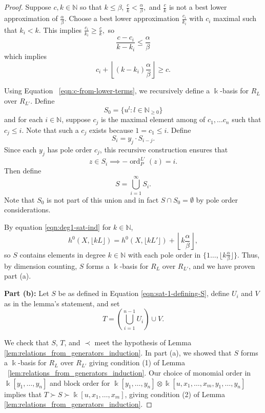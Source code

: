 \documentclass{amsart}
\theoremstyle{plain}
\theoremstyle{definition}
\theoremstyle{remark}
\numberwithin{equation}{section}
\newcommand\BN{{\mathbb N}}
\newcommand\Bk{{\Bbbk}}
\DeclareMathOperator{\ord}{ord}
\newcommand{\halfcan}{L}
\begin{document}
\begin{proof}
Suppose $c,k \in \BN$ so that $k \le \beta$,  $\frac{c}{k} < \frac{\alpha}{
\beta},$ and $\frac{c}{k}$ is not a best lower approximation of $\frac{\alpha}{\beta}$. Choose a
best lower approximation $\frac{c_i}{k_i}$ with $c_i$ maximal such that $k_i< k$.  This implies $\frac{c_i}{k_i}\ge \frac{c}{k},$ so 
\[
	\frac{c-c_i}{k-k_i}\le \frac{\alpha}{\beta}
\]
which implies
\begin{equation}\label{eqn:c-from-lower-terms}
	c_i +\left\lfloor (k-k_i) \frac{\alpha}{\beta} \right\rfloor \ge c.
\end{equation}

Using Equation ~\ref{eqn:c-from-lower-terms}, we recursively define a $\Bk$-basis for $R_\halfcan$ over $R_{\halfcan'}$. Define 
\[
	S_0 = \{u^l : l \in \BN_{\ge 0}\}
\]
and for each $i \in \BN$, suppose $c_j$ is the maximal element among of $c_1, \ldots c_n$ such that $c_j \le i.$ Note that such a $c_j$ exists because $1=c_1\le i.$ Define
\[
	S_i = y_j \cdot S_{i-j}.
\]
Since each $y_j$ has pole order $c_j$, this recursive construction ensures that 
\[
	z\in S_i \implies -\ord_P^{\halfcan'}(z)=i.
\]
Then define 
\begin{equation}\label{eqn:sat-1-defining-S}
	S = \bigcup_{i=1}^{\infty} S_i.  
\end{equation}
Note that $S_0$ is not part of this union and in fact $S\cap S_0 = \emptyset$ by pole order considerations.

By equation \ref{eqn:deg1-sat-ind} for $k \in \BN$,
\[
	h^0(X, \lfloor k \halfcan \rfloor) = h^0(X, \lfloor k \halfcan'
		\rfloor) + \left\lfloor k \frac{\alpha} {\beta} \right \rfloor,
\] 
so $S$ contains elements in degree $k \in \BN$ with each pole order in $\{1 \ldots, \lfloor k\frac{\alpha}{\beta}\rfloor\}$.  Thus, by dimension counting, $S$ forms a $\Bk$-basis for $R_\halfcan$ over $R_{\halfcan'}$, and we have proven part (a).

{\bf Part (b):}
Let $S$ be as defined in Equation \ref{eqn:sat-1-defining-S}, define $U_i$ and $V$ as in the lemma's statement, and set
\[
	T = \left(\bigcup_{i=1}^{n-1} U_i \right) \cup V.
\]

We check that $S$, $T$, and $\prec$ meet the hypothesis of Lemma \ref{lem:relations_from_generators_induction}.  In part (a), we showed that $S$ forms a $\Bk$-basis for $R_\halfcan$ over $R_{\halfcan'}$ giving condition (1) of Lemma ~\ref{lem:relations_from_generators_induction}.  Our choice of monomial order in $\Bk[y_1, \ldots, y_n]$ and block order for $\Bk[y_1, \ldots, y_n]\otimes \Bk[u, x_1, \ldots, x_m, y_1, \ldots, y_n]$ implies that $T\succ S\succ \Bk[u, x_1, \ldots, x_m]$, giving condition (2) of Lemma \ref{lem:relations_from_generators_induction}.  


\end{proof}
\end{document}
